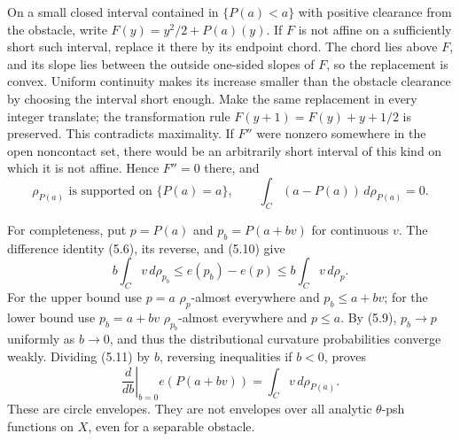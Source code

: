 \documentclass[11pt]{article}
\theoremstyle{definition}\newtheorem{definition}[theorem]{Definition}
\begin{document}
On a small closed interval contained in $\{P(a)<a\}$ with positive
clearance from the obstacle, write $F(y)=y^2/2+P(a)(y)$. If $F$ is not
affine on a sufficiently short such interval, replace it there by its
endpoint chord. The chord lies above $F$, and its slope lies between
the outside one-sided slopes of $F$, so the replacement is convex.
Uniform continuity makes its increase smaller than the obstacle
clearance by choosing the interval short enough. Make the same
replacement in every integer translate; the transformation rule
$F(y+1)=F(y)+y+1/2$ is preserved. This contradicts maximality.
If $F''$ were nonzero somewhere in the open noncontact set, there would
be an arbitrarily short interval of this kind on which it is not affine.
Hence $F''=0$ there, and
\[
 \rho_{P(a)}\text{ is supported on }\{P(a)=a\},\qquad
 \int_C(a-P(a))\,d\rho_{P(a)}=0.                        \tag{5.10}
\]

For completeness, put $p=P(a)$ and $p_b=P(a+bv)$ for continuous $v$.
The difference identity (5.6), its reverse, and (5.10) give
\[
 b\int_C v\,d\rho_{p_b}
 \le e(p_b)-e(p)\le b\int_Cv\,d\rho_p.                 \tag{5.11}
\]
For the upper bound use $p=a$ $\rho_p$-almost everywhere and
$p_b\le a+bv$; for the lower bound use $p_b=a+bv$
$\rho_{p_b}$-almost everywhere and $p\le a$.
By (5.9), $p_b\to p$ uniformly as $b\to0$, and thus the
distributional curvature probabilities converge weakly. Dividing (5.11)
by $b$, reversing inequalities if $b<0$, proves
\[
 \left.\frac d{db}\right|_{b=0}e(P(a+bv))
                  =\int_C v\,d\rho_{P(a)}.              \tag{5.12}
\]
These are circle envelopes. They are not envelopes over all analytic
$\theta$-psh functions on $X$, even for a separable obstacle.
\end{document}
